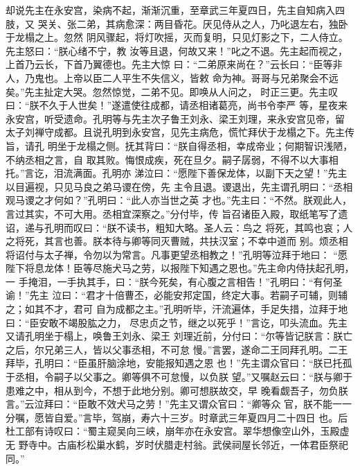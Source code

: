 却说先主在永安宫，染病不起，渐渐沉重，至章武三年夏四日，先主自知病入四肢，又
哭关、张二弟，其病愈深：两目昏花。厌见侍从之人，乃叱退左右，独卧于龙榻之上。忽然
阴风骤起，将灯吹摇，灭而复明，只见灯影之下，二人侍立。先主怒曰：“朕心绪不宁，教
汝等且退，何故又来！”叱之不退。先主起而视之，上首乃云长，下首乃翼德也。先主大惊
曰：“二弟原来尚在？”云长曰：“臣等非人，乃鬼也。上帝以臣二人平生不失信义，皆敕
命为神。哥哥与兄弟聚会不远矣。”先主扯定大哭。忽然惊觉，二弟不见。即唤从人问之，
时正三更。先主叹曰：“朕不久于人世矣！”遂遣使往成都，请丞相诸葛亮，尚书令李严
等，星夜来永安宫，听受遗命。孔明等与先主次子鲁王刘永、梁王刘理，来永安宫见帝，留
太子刘禅守成都。且说孔明到永安宫，见先主病危，慌忙拜伏于龙榻之下。先主传旨，请孔
明坐于龙榻之侧。抚其背曰：“朕自得丞相，幸成帝业；何期智识浅陋，不纳丞相之言，自
取其败。悔恨成疾，死在旦夕。嗣子孱弱，不得不以大事相托。”言讫，泪流满面。孔明亦
涕泣曰：“愿陛下善保龙体，以副下天之望！”先主以目遍视，只见马良之弟马谡在傍，先
主令且退。谡退出，先主谓孔明曰：“丞相观马谡之才何如？”孔明曰：“此人亦当世之英
才也。”先主曰：“不然。朕观此人，言过其实，不可大用。丞相宜深察之。”分付毕，传
旨召诸臣入殿，取纸笔写了遗诏，递与孔明而叹曰：“朕不读书，粗知大略。圣人云：鸟之
将死，其鸣也哀；人之将死，其言也善。朕本待与卿等同灭曹贼，共扶汉室；不幸中道而
别。烦丞相将诏付与太子禅，令勿以为常言。凡事更望丞相教之！”孔明等泣拜于地曰：
“愿陛下将息龙体！臣等尽施犬马之劳，以报陛下知遇之恩也。”先主命内侍扶起孔明，一
手掩泪，一手执其手，曰：“朕今死矣，有心腹之言相告！”孔明曰：“有何圣谕！”先主
泣曰：“君才十倍曹丕，必能安邦定国，终定大事。若嗣子可辅，则辅之；如其不才，君可
自为成都之主。”孔明听毕，汗流遍体，手足失措，泣拜于地曰：“臣安敢不竭股肱之力，
尽忠贞之节，继之以死乎！”言讫，叩头流血。先主又请孔明坐于榻上，唤鲁王刘永、梁王
刘理近前，分付曰：“尔等皆记朕言：朕亡之后，尔兄弟三人，皆以父事丞相，不可怠
慢。”言罢，遂命二王同拜孔明。二王拜毕，孔明曰：“臣虽肝脑涂地，安能报知遇之恩
也！”先主谓众官曰：“朕已托孤于丞相，令嗣子以父事之。卿等俱不可怠慢，以负朕
望。”又嘱赵云曰：“朕与卿于患难之中，相从到今，不想于此地分别。卿可想朕故交，早
晚看觑吾子，勿负朕言。”云泣拜曰：“臣敢不效犬马之劳！”先主又谓众官曰：“卿等众
官，朕不能一一分嘱，愿皆自爱。”言毕，驾崩，寿六十三岁。时章武三年夏四月二十四日
也。后杜工部有诗叹曰：“蜀主窥吴向三峡，崩年亦在永安宫。翠华想像空山外，玉殿虚无
野寺中。古庙杉松巢水鹤，岁时伏腊走村翁。武侯祠屋长邻近，一体君臣祭祀同。”

